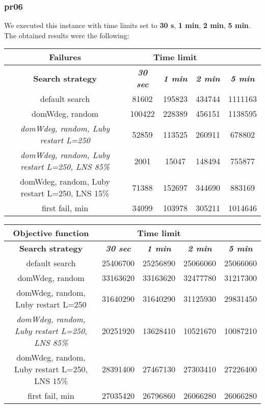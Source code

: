 \subsubsection{pr06}
We executed this instance with time limits set to \textbf{30 s}, \textbf{1 min}, \textbf{2 min}, \textbf{5 min}.\\
The obtained results were the following:
{
\renewcommand{\arraystretch}{2}
\begin{longtable}[h]{| c | c | c | c | c |}
    \hline
    \textbf{Failures} & \multicolumn{3}{c}{Time limit} & \\
    \hline
    \textbf{Search strategy} & \textbf{\textit{30 sec}} & \textbf{\textit{1 min}} & \textbf{\textit{2 min}} & \textbf{\textit{5 min}} \\
    \hline
    \endhead
    default search                                         &  81602 & 195823 & 434744 & 1111163 \\
    \hline
    domWdeg, random                                        & 100422 & 228389 & 456151 & 1138595 \\
    \hline
    \textit{domWdeg, random, Luby restart L=250}           &  52859 & 113525 & 260911 &  678802 \\
    \hline
    \textit{domWdeg, random, Luby restart L=250, LNS 85\%} &   2001 &  15047 & 148494 &  755877 \\
    \hline
    domWdeg, random, Luby restart L=250, LNS 15\%          &  71388 & 152697 & 344690 &  883169 \\
    \hline
    first fail, min                                        &  34099 & 103978 & 305211 & 1014646 \\
    \hline
\end{longtable}
}

{
\renewcommand{\arraystretch}{2}
\begin{longtable}[h]{| c | c | c | c | c |}
    \hline
    \textbf{Objective function} & \multicolumn{3}{c}{Time limit} & \\
    \hline
    \textbf{Search strategy} & \textbf{\textit{30 sec}} & \textbf{\textit{1 min}} & \textbf{\textit{2 min}} & \textbf{\textit{5 min}} \\
    \hline
    \endhead
    default search                                         & 25406700 & 25256890 & 25066060 & 25066060 \\
    \hline
    domWdeg, random                                        & 33163620 & 33163620 & 32477780 & 31217300 \\
    \hline
    domWdeg, random, Luby restart L=250                    & 31640290 & 31640290 & 31125930 & 29831450 \\
    \hline
    \textit{domWdeg, random, Luby restart L=250, LNS 85\%} & 20251920 & 13628410 & 10521670 & 10087210 \\
    \hline
    domWdeg, random, Luby restart L=250, LNS 15\%          & 28391400 & 27467130 & 27303410 & 27226400 \\
    \hline
    first fail, min                                        & 27035420 & 26796860 & 26066280 & 26066280 \\
    \hline
\end{longtable}
}